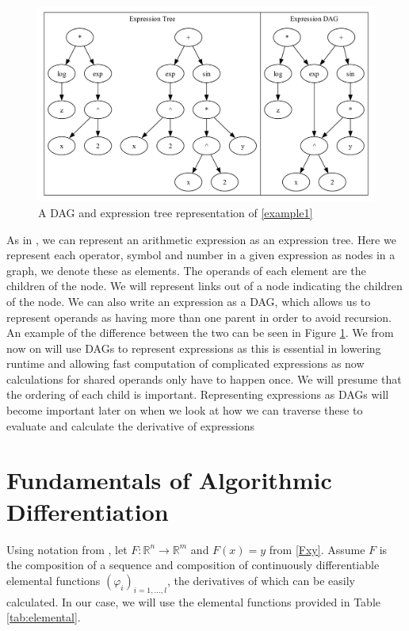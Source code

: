 \documentclass{article}
\begin{document}
\begin{figure}[h]
    \centering
    \includegraphics[width=12cm]{images/Graph_Cluster_1.pdf}
    \caption{A DAG and expression tree representation of \eqref{example1}}
    \label{fig:DAGgraph2}
\end{figure}

As in \cite{PoPBook}, we can represent an arithmetic expression as an expression tree. Here we represent each operator, symbol and number in a given expression as nodes in a graph, we denote these as elements. The operands of each element are the children of the node. We will represent links out of a node indicating the children of the node. We can also write an expression as a DAG, which allows us to represent operands as having more than one parent in order to avoid recursion. An example of the difference between the two can be seen in Figure \ref{fig:DAGgraph2}. We from now on will use DAGs to represent expressions as this is essential in lowering runtime and allowing fast computation of complicated expressions as now calculations for shared operands only have to happen once. We will presume that the ordering of each child is important. Representing expressions as DAGs will become important later on when we look at how we can traverse these to evaluate and calculate the derivative of expressions

\section{Fundamentals of Algorithmic Differentiation}

Using notation from \cite{evald}, let $F: \mathbb{R}^n \rightarrow \mathbb{R}^m$ and $F(x) = y$ from \eqref{Fxy}. Assume $F$ is the composition of a sequence and composition of continuously differentiable elemental functions $(\varphi_i)_{i=1,\ldots, l}$, the derivatives of which can be easily calculated. In our case, we will use the elemental functions provided in Table \ref{tab:elemental}.
\end{document}
